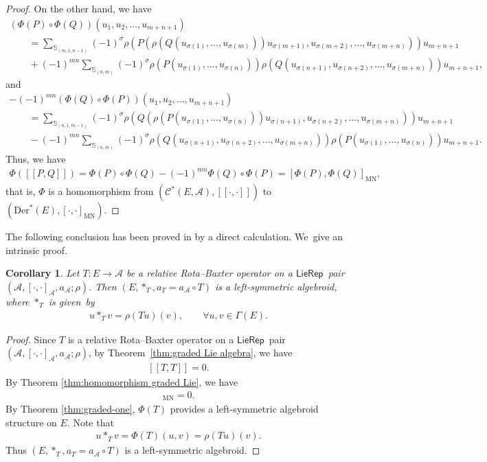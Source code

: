 \documentclass[pdftex]{sigma}%
\numberwithin{equation}{section}
\newtheorem{cor}[thm]{Corollary}
\newcommand{\huaA}{\mathcal{A}}
\newcommand{\huaC}{\mathcal{C}}
\newcommand{\Courant}[1]{\left[\!\left[ #1\right]\!\right]}
\newcommand{\Der}{\mathrm{Der}}
\newcommand{\MN}{\mathrm{MN}}
\newcommand{\LP}{$\mathsf{LieRep}$~}
\begin{document}
\begin{proof}
On the other hand, we have
\begin{gather*}
(\Phi(P)\circ\Phi(Q))(u_1,u_2,\dots,u_{m+n+1})
\\ \qquad
{}=\!\!\sum_{\mathbb{S}_{(m,1,n-1)}}\!\!(-1)^{\sigma}\rho(P(\rho(Q(u_{\sigma(1)},\dots,u_{\sigma(m)})) u_{\sigma(m+1)},u_{\sigma(m+2)},\dots,u_{\sigma(m+n)}))u_{m+n+1}
\\ \qquad
{}+(-1)^{mn}\!\!\sum_{\mathbb{S}_{(n,m)}}\!\!\!(-1)^{\sigma}\rho(P(u_{\sigma(1)},\dots,u_{\sigma(n)})) \rho(Q(u_{\sigma(n+1)},u_{\sigma(n+2)},\dots,u_{\sigma(m+n)}))u_{m+n+1},
\end{gather*}
and
\begin{gather*}
-(-1)^{mn}(\Phi(Q)\circ\Phi(P))(u_1,u_2,\dots,u_{m+n+1})
\\ \qquad
{}=\sum_{\mathbb{S}_{(n,1,m-1)}}(-1)^{\sigma}\rho(Q(\rho(P(u_{\sigma(1)},\dots,u_{\sigma(n)})) u_{\sigma(n+1)},u_{\sigma(n+2)},\dots,u_{\sigma(m+n)}))u_{m+n+1}
\\ \qquad
{}-(-1)^{mn}\!\!\sum_{\mathbb{S}_{(n,m)}}\!\!(-1)^{\sigma}
\rho(Q(u_{\sigma(n+1)},u_{\sigma(n+2)},\dots,u_{\sigma(m+n)})) \rho(P(u_{\sigma(1)},\dots,u_{\sigma(n)}))u_{m+n+1}.
\end{gather*}
Thus, we have
\begin{gather*}
\Phi(\Courant{P,Q})=\Phi(P)\circ\Phi(Q)-(-1)^{mn}\Phi(Q)\circ\Phi(P)=[\Phi(P),\Phi(Q)]_\MN,
\end{gather*}
that is, $\Phi$ is a homomorphism from $(\huaC^*(E,\huaA),\Courant{\cdot,\cdot})$ to $(\Der^*(E),[\cdot,\cdot]_{\MN})$.
\end{proof}



The following conclusion has been proved in \cite{LiuShengBaiChen} by a direct calculation. We~give an intrinsic proof.
\begin{cor}\label{cor:construction left-symmetrci algebroid}
{\sloppy
Let $T\colon E\longrightarrow \huaA$ be a relative Rota--Baxter operator on a \LP pair $(\huaA,[\cdot,\cdot]_\huaA,a_\huaA;\rho)$. Then $(E, \ast_{T}, a_T=a_\huaA\circ T)$ is a left-symmetric algebroid, where $\ast_{T}$ is given~by
\begin{gather*}
u\ast_{T}v=\rho(Tu)(v),\qquad \forall u,v\in\Gamma(E).
\end{gather*}}
\end{cor}

\begin{proof}
 Since $T$ is a relative Rota--Baxter operator on a \LP pair $(\huaA,[\cdot,\cdot]_\huaA,a_\huaA;\rho)$, by Theo\-rem~\ref{thm:graded Lie algebra}, we have
\begin{gather*}
\Courant{T,T}=0.
\end{gather*}
By Theorem \ref{thm:homomorphism graded Lie}, we have
\begin{gather*}
[\Phi(T),\Phi(T)]_{\MN}=0.
\end{gather*}
By Theorem \ref{thm:graded-one}, $\Phi(T)$ provides a left-symmetric algebroid structure on $E$. Note that
\begin{gather*}
u\ast_{T}v=\Phi(T)(u,v)=\rho(Tu)(v).
\end{gather*}
 Thus $(E, \ast_{T}, a_T=a_\huaA\circ T)$ is a left-symmetric algebroid.
\end{proof}
\end{document}
